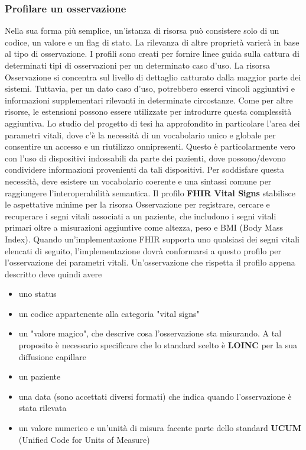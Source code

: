 \documentclass{article}
\begin{document}
\subsubsection{Profilare un osservazione}
Nella sua forma più semplice, un'istanza di risorsa può consistere solo di un codice, un valore e un flag di stato.
La rilevanza di altre proprietà varierà in base al tipo di osservazione.
I profili sono creati per fornire linee guida sulla cattura di determinati tipi di osservazioni per un determinato caso d'uso.
La risorsa Osservazione si concentra sul livello di dettaglio catturato dalla maggior parte dei sistemi.
Tuttavia, per un dato caso d'uso, potrebbero esserci vincoli aggiuntivi e informazioni supplementari rilevanti in determinate circostanze.
Come per altre risorse, le estensioni possono essere utilizzate per introdurre questa complessità aggiuntiva.
Lo studio del progetto di tesi ha approfondito in particolare l'area dei parametri vitali, dove c'è la necessità di un vocabolario unico
e globale per consentire un accesso e un riutilizzo onnipresenti. Questo è particolarmente vero con l'uso di dispositivi indossabili da
parte dei pazienti, dove possono/devono condividere informazioni provenienti da tali dispositivi. Per soddisfare questa necessità,
deve esistere un vocabolario coerente e una sintassi comune per raggiungere l'interoperabilità semantica.
Il profilo \textbf{FHIR Vital Signs} stabilisce le aspettative minime per la risorsa Osservazione per registrare, cercare e recuperare i segni vitali
associati a un paziente, che includono i segni vitali primari oltre a misurazioni aggiuntive come altezza, peso e BMI (Body Mass Index).
Quando un'implementazione FHIR supporta uno qualsiasi dei segni vitali elencati di seguito, l'implementazione dovrà conformarsi a questo profilo per l'osservazione dei parametri vitali.
Un'osservazione che rispetta il profilo appena descritto deve quindi avere
\begin{itemize}
    \item uno status
    \item un codice appartenente alla categoria "vital signs"
    \item un "valore magico", che descrive cosa l'osservazione sta misurando.
          A tal proposito è necessario specificare che lo standard scelto è \textbf{LOINC} per la sua diffusione capillare
    \item un paziente
    \item una data (sono accettati diversi formati) che indica quando l'osservazione è stata rilevata
    \item un valore numerico e un'unità di misura facente parte dello standard \textbf{UCUM} (Unified Code for Units of Measure)
\end{itemize}
\end{document}
